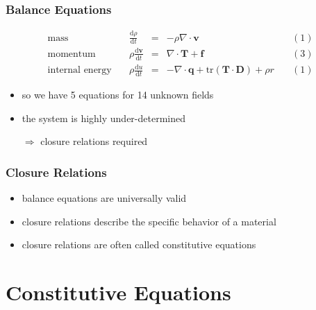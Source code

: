 \documentclass[hide notes,intlimits]{beamer}
\begin{document}
\begin{frame}
  \frametitle{Balance Equations}
  \begin{equation*}
  \begin{array}{lcclc}
    \text{mass} \quad &  \frac{\text{d} \rho}{\text{d} t} & = & -\rho\nabla \cdot \mathbf{v} \quad & (1)\\[.25em]
    \text{momentum} \quad & \rho \frac{\text{d} \mathbf{v}}{\text{d} t} & = & \nabla \cdot \mathbf{T} + \mathbf{f} \quad & (3) \\[.25em]
    \text{internal energy} \quad & \rho\frac{\text{d} u}{\text{d} t} & = & - \nabla \cdot \mathbf{q} + \text{tr} \left(\mathbf{T}\cdot\mathbf{D}\right) + \rho r\quad & (1)
  \end{array}
  \end{equation*}
  \begin{itemize}
   \item so we have 5 equations for 14 unknown fields
   \item the system is highly under-determined
   \item[$\Rightarrow$] \alert{closure relations} required
 \end{itemize}
\end{frame}



\begin{frame}
  \frametitle{Closure Relations}
  \begin{itemize}
    \item \alert{balance equations} are universally valid
    \item \alert{closure relations} describe the specific behavior of a material
    \item \alert{closure relations} are often called \alert{constitutive equations}
  \end{itemize}
\end{frame}


\section{Constitutive Equations}
\end{document}

